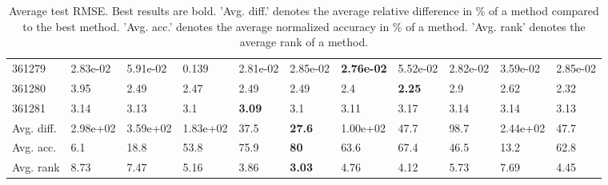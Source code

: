 \begin{table}[ht!]
\begin{tabular}{lllllllllll}
  361279 & 2.83e-02 & 5.91e-02 & 0.139 & 2.81e-02 & 2.85e-02 & \textbf{2.76e-02} & 5.52e-02 & 2.82e-02 & 3.59e-02 & 2.85e-02 \\ 
  361280 & 3.95 & 2.49 & 2.47 & 2.49 & 2.49 & 2.4 & \textbf{2.25} & 2.9 & 2.62 & 2.32 \\ 
  361281 & 3.14 & 3.13 & 3.1 & \textbf{3.09} & 3.1 & 3.11 & 3.17 & 3.14 & 3.14 & 3.13 \\ 
   \hline
Avg. diff. & 2.98e+02 & 3.59e+02 & 1.83e+02 & 37.5 & \textbf{27.6} & 1.00e+02 & 47.7 & 98.7 & 2.44e+02 & 47.7 \\ 
  Avg. acc. & 6.1 & 18.8 & 53.8 & 75.9 & \textbf{80} & 63.6 & 67.4 & 46.5 & 13.2 & 62.8 \\ 
  Avg. rank & 8.73 & 7.47 & 5.16 & 3.86 & \textbf{3.03} & 4.76 & 4.12 & 5.73 & 7.69 & 4.45 \\ 
   \hline
\hline
\end{tabular}
\endgroup
\caption{Average test RMSE. 
                  Best results are bold. 
                  'Avg. diff.' denotes the average relative difference in \% of a method compared to the best method.
                  'Avg. acc.' denotes the average normalized accuracy in \% of a method.
                  'Avg. rank' denotes the average rank of a method.} 
\label{TABLES/table_results_RMSE}
\end{table}
